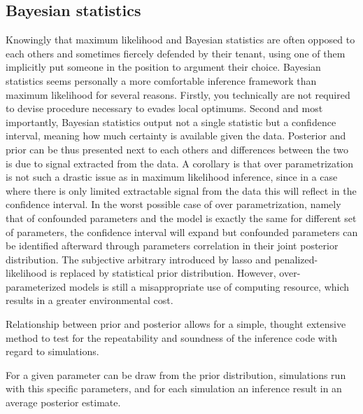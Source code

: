 \subsection{Bayesian statistics}
Knowingly that maximum likelihood and Bayesian statistics are often opposed to each others and sometimes fiercely defended by their tenant, using one of them implicitly put someone in the position to argument their choice. 
Bayesian statistics seems personally a more comfortable inference framework than maximum likelihood for several reasons. 
Firstly, you technically are not required to devise procedure necessary to evades local optimums.
Second and most importantly, Bayesian statistics output not a single statistic but a confidence interval, meaning how much certainty is available given the data.
Posterior and prior can be thus presented next to each others and differences between the two is due to signal extracted from the data.
A corollary is that over parametrization is not such a drastic issue as in maximum likelihood inference, since in a case where there is only limited extractable signal from the data this will reflect in the confidence interval.
In the worst possible case of over parametrization, namely that of confounded parameters and the model is exactly the same for different set of parameters, the confidence interval will expand but confounded parameters can be identified afterward through parameters correlation in their joint posterior distribution.
The subjective arbitrary introduced by lasso and penalized-likelihood is replaced by statistical prior distribution.
However, over-parameterized models is still a misappropriate use of computing resource, which results in a greater environmental cost.

Relationship between prior and posterior allows for a simple, thought extensive method to test for the repeatability and soundness of the inference code with regard to simulations.

For a given parameter  can be draw from the prior distribution, simulations run with this specific parameters, and for each simulation an inference result in an average posterior estimate.






